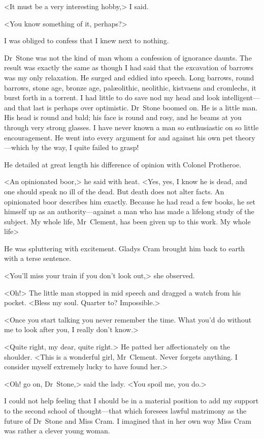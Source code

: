 <It must be a very interesting hobby,> I said.

<You know something of it, perhaps?>

I was obliged to confess that I knew next to nothing.

Dr~Stone was not the kind of man whom a confession of ignorance daunts. The result was exactly the same as though I had said that the excavation of barrows was my only relaxation. He surged and eddied into speech. Long barrows, round barrows, stone age, bronze age, palæolithic, neolithic, kistvaens and cromlechs, it burst forth in a torrent. I had little to do save nod my head and look intelligent—and that last is perhaps over optimistic. Dr~Stone boomed on. He is a little man. His head is round and bald; his face is round and rosy, and he beams at you through very strong glasses. I have never known a man so enthusiastic on so little encouragement. He went into every argument for and against his own pet theory—which by the way, I quite failed to grasp!

He detailed at great length his difference of opinion with Colonel Protheroe.

<An opinionated boor,> he said with heat. <Yes, yes, I know he is dead, and one should speak no ill of the dead. But death does not alter facts. An opinionated boor describes him exactly. Because he had read a few books, he set himself up as an authority—against a man who has made a lifelong study of the subject. My whole life, Mr~Clement, has been given up to this work. My whole life\longdash>

He was spluttering with excitement. Gladys Cram brought him back to earth with a terse sentence.

<You'll miss your train if you don't look out,> she observed.

<Oh!> The little man stopped in mid speech and dragged a watch from his pocket. <Bless my soul. Quarter to? Impossible.>

<Once you start talking you never remember the time. What you'd do without me to look after you, I really don't know.>

<Quite right, my dear, quite right.> He patted her affectionately on the shoulder. <This is a wonderful girl, Mr~Clement. Never forgets anything. I consider myself extremely lucky to have found her.>

<Oh! go on, Dr~Stone,> said the lady. <You spoil me, you do.>

I could not help feeling that I should be in a material position to add my support to the second school of thought—that which foresees lawful matrimony as the future of Dr~Stone and Miss Cram. I imagined that in her own way Miss Cram was rather a clever young woman.

